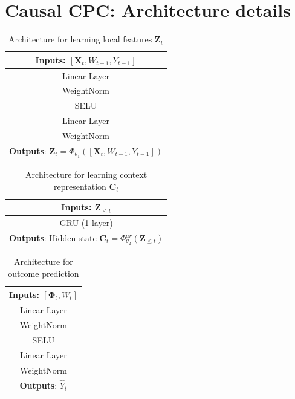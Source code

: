 \documentclass{article}
\theoremstyle{plain}
\theoremstyle{definition}
\theoremstyle{remark}
\begin{document}
\section{Causal CPC: Architecture details}
\label{sect: archi_ccpc}
\begin{table}[!htbp]
\centering
\begin{tabular}{c}
\hline \textbf{Inputs}: $[\mathbf{X}_{t}, W_{t-1}, Y_{t-1}]$\\
\hline Linear Layer\\
\hline WeightNorm\\
\hline SELU\\
\hline Linear Layer  \\
\hline WeightNorm\\
\hline \textbf{Outputs}: $\mathbf{Z}_t = \Phi_{\theta_1}([\mathbf{X}_{t}, W_{t-1}, Y_{t-1}])$\\
\end{tabular}
\caption{Architecture for learning local features $\mathbf{Z}_t$}
\label{tab: archi_loc_feat}
\end{table}


\begin{table}[!htbp]
\centering
\begin{tabular}{c}
\hline \textbf{Inputs}: $\mathbf{Z}_{\leq t}$\\
\hline GRU (1 layer)\\
\hline \textbf{Outputs}: Hidden state $\mathbf{C}_t = \Phi_{\theta_2}^{ar}(\mathbf{Z}_{\leq t})$\\
\end{tabular}
\caption{Architecture for learning context representation $\mathbf{C}_t$ }
\label{tab: archi_context }
\end{table}

\begin{table}[!htbp]
\centering
\begin{tabular}{c}
\hline \textbf{Inputs}: $[\mathbf{\Phi}_t, W_t]$\\
\hline Linear Layer\\
\hline WeightNorm\\
\hline SELU\\
\hline Linear Layer  \\
\hline WeightNorm\\
\hline \textbf{Outputs}: $\hat{Y}_t$\\
\end{tabular}
\caption{Architecture for outcome prediction}
\label{tab: archi_outc_pred}
\end{table}
\end{document}
